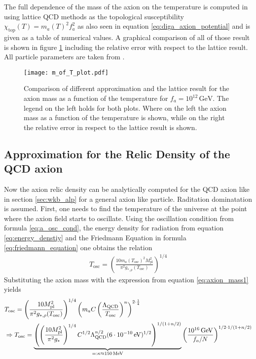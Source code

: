 \documentclass[a4paper, 12pt]{article}
\begin{document}
The full dependence of the mass of the axion on the temperature is computed in \cite{LatticQCD4Cosmo}
using lattice QCD methods as the topological susceptibility $\chi_\mathrm{top}(T) = m_a(T)^2 f_a^2$ as also seen in equation \ref{eq:diga_axion_potential}
and is given as a table of numerical values.
A graphical comparison of all of those result is shown in figure \ref{fig:m_a_of_T_plot}
including the relative error with respect to the lattice result.
All particle parameters are taken from \cite{PDG}.
\begin{figure}
    \centering
    \texttt{[image: m\_of\_T\_plot.pdf]}
    \caption{Comparison of different approximation and the lattice result for the axion mass as a
    function of the temperature for $f_a = 10^{12} \, \mathrm{GeV}$.
    The legend on the left holds for both plots. Where on the left the axion mass as a function of
    the temperature is shown, while on the right the relative error in respect to the lattice result
    is shown.}
    \label{fig:m_a_of_T_plot}
\end{figure}

\subsection{Approximation for the Relic Density of the QCD axion}
\label{sec:wkb_qcd}
Now the axion relic density can be analytically computed for the QCD axion like
in section \ref{sec:wkb_alp} for a general axion like particle. Raditation dominatation
is assumed.
First, one needs to find the temperature of the universe at the point where the
axion field starts to oscillate.
Using the oscillation condition from formula \ref{eq:a_osc_cond},
the energy density for radiation from equation \ref{eq:energy_denstiy} and the Friedmann Equation in formula \ref{eq:friedmann_equation}
one obtains the relation
\begin{align*}
    T_\mathrm{osc} = \left( \frac{10 m_a(T_\mathrm{osc})^2 M_\mathrm{pl}^2}{\pi^2 g_{*, \rho}(T_\mathrm{osc})} \right)^{1/4}
\end{align*}
Substituting the axion mass with the expression from equation \ref{eq:axion_mass1} yields
\begin{align}
    \label{eq:T_osc1}
    \notag & T_\mathrm{osc} = \left( \frac{10 M_\mathrm{pl}^2}{\pi^2 g_{*, \rho}(T_\mathrm{osc})} \right)^{1/4} \left( m_a C \left( \frac{\Lambda_\mathrm{QCD}}{T_\mathrm{osc}} \right)^{n} \right)^{2 \cdot \frac{1}{4}}
    \\ & \Rightarrow T_\mathrm{osc} = \underbrace{\left( \left( \frac{10 M_\mathrm{pl}^2}{\pi^2 g_*} \right)^{1/4} C^{1/2} \Lambda_\mathrm{QCD}^{n/2} (6 \cdot 10^{-10} \, \mathrm{eV})^{1/2} \right)^{1/(1 + n/2)} }_{=: \kappa \approx 150 \, \mathrm{MeV} } \left( \frac{10^{16} \, \mathrm{GeV}}{f_a / N} \right)^{1/2 \cdot 1/(1 + n/2)}
\end{align}
\end{document}
